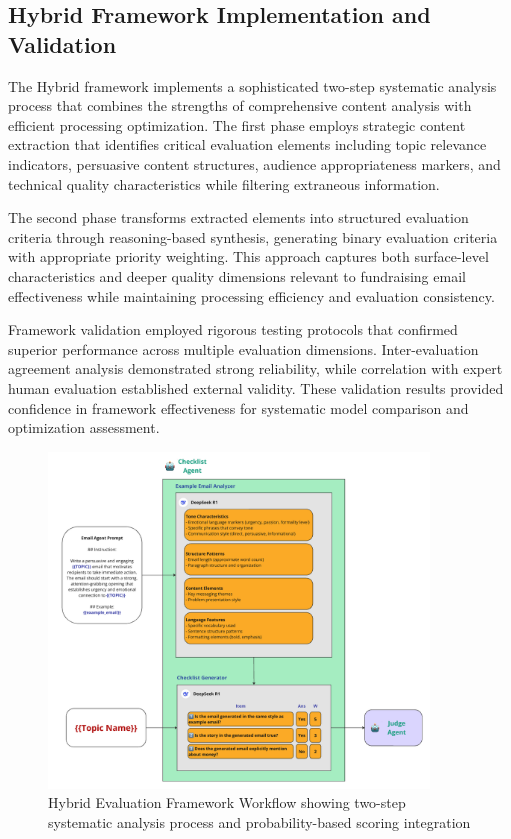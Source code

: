 \subsection{Hybrid Framework Implementation and Validation}

The Hybrid framework implements a sophisticated two-step systematic analysis process that combines the strengths of comprehensive content analysis with efficient processing optimization. The first phase employs strategic content extraction that identifies critical evaluation elements including topic relevance indicators, persuasive content structures, audience appropriateness markers, and technical quality characteristics while filtering extraneous information.

The second phase transforms extracted elements into structured evaluation criteria through reasoning-based synthesis, generating binary evaluation criteria with appropriate priority weighting. This approach captures both surface-level characteristics and deeper quality dimensions relevant to fundraising email effectiveness while maintaining processing efficiency and evaluation consistency.

Framework validation employed rigorous testing protocols that confirmed superior performance across multiple evaluation dimensions. Inter-evaluation agreement analysis demonstrated strong reliability, while correlation with expert human evaluation established external validity. These validation results provided confidence in framework effectiveness for systematic model comparison and optimization assessment.

\begin{figure}[H]
    \centering
    \includegraphics[width=0.9\textwidth]{figures/hybrid-checklist.png}
    \caption[Hybrid Evaluation Framework Workflow]{Hybrid Evaluation Framework Workflow showing two-step systematic analysis process and probability-based scoring integration}
    \label{fig:hybrid-framework-workflow}
\end{figure}


